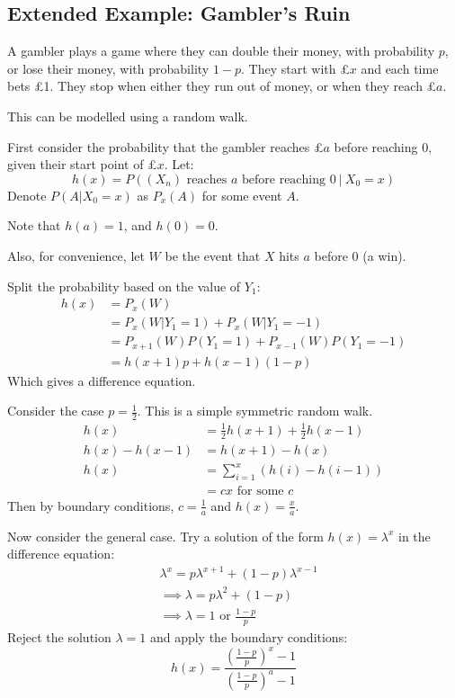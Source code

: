 \documentclass[../Main.tex]{subfiles}
\begin{document}
\subsection{Extended Example: Gambler's Ruin}
A gambler plays a game where they can double their money, with probability $p$, or lose their money, with probability $1-p$. They start with £$x$ and each time bets £1. They stop when either they run out of money, or when they reach £$a$.\par
This can be modelled using a random walk.\par
First consider the probability that the gambler reaches £$a$ before reaching $0$, given their start point of £$x$. Let:
\begin{equation*}
    h(x) = P((X_n) \text{ reaches } a \text{ before reaching } 0~|~X_0 = x)
\end{equation*}
Denote $P(A | X_0 = x)$ as $P_x(A)$ for some event $A$.\par
Note that $h(a) = 1$, and $h(0) = 0$.\par
Also, for convenience, let $W$ be the event that $X$ hits $a$ before $0$ (a win).\par
Split the probability based on the value of $Y_1$:
\begin{align*}
    h(x) &= P_x(W) \\
    &= P_x(W | Y_1 = 1) + P_x(W | Y_1 = -1)\\
    &= P_{x+1}(W)P(Y_1 = 1)+ P_{x-1}(W)P(Y_1 = -1) \\
    &= h(x + 1)p + h(x - 1)(1 - p)
\end{align*}
Which gives a difference equation.\par
Consider the case $p = \frac{1}{2}$. This is a simple symmetric random walk.
\begin{align*}
    h(x) &= \frac{1}{2} h(x + 1) + \frac{1}{2} h(x - 1) \\
    h(x) - h(x - 1) &= h(x + 1) - h(x) \\
    h(x) &= \sum_{i=1}^x (h(i) - h(i - 1)) \\
    &= cx \text{ for some } c
\end{align*}
Then by boundary conditions, $c = \frac{1}{a}$ and $h(x) = \frac{x}{a}$.\par
Now consider the general case. Try a solution of the form $h(x) = \lambda^x$ in the difference equation:
\begin{align*}
    &\lambda^x = p \lambda^{x + 1} + (1 - p) \lambda^{x - 1} \\
    &\implies \lambda = p\lambda^2 + (1 - p) \\
    &\implies \lambda = 1 \text{ or } \frac{1 - p}{p}
\end{align*}
Reject the solution $\lambda = 1$ and apply the boundary conditions:
\begin{equation*}
    h(x) = \frac{\left(\frac{1-p}{p}\right)^x - 1}{\left(\frac{1-p}{p}\right)^a - 1}
\end{equation*}
\end{document}
